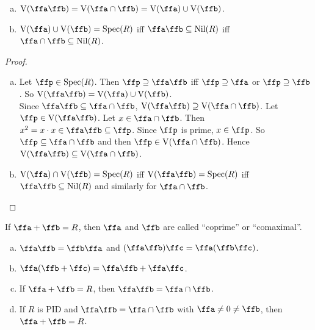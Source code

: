 \begin{proposition}
    \begin{enumerate}[(a)]
        \item 
            $\operatorname{V}(\ffa \ffb) = \operatorname{V}(\ffa \cap \ffb) = \operatorname{V}(\ffa) \cup \operatorname{V}(\ffb)$.
        \item 
            $\operatorname{V}(\ffa) \cup \operatorname{V}(\ffb) = \operatorname{Spec}(R)$ iff $\ffa \ffb \subseteq \operatorname{Nil}(R)$ iff $\ffa \cap \ffb \subseteq \operatorname{Nil}(R)$.
    \end{enumerate}
\end{proposition}

\begin{proof}
    \begin{enumerate}[(a)]
        \item Let $\ffp \in \operatorname{Spec}(R)$. Then $\ffp \supseteq \ffa \ffb$ iff $\ffp \supseteq \ffa$ or $\ffp \supseteq \ffb$. So $\operatorname{V}(\ffa \ffb) = \operatorname{V}(\ffa) \cup \operatorname{V}(\ffb)$. \\
            Since $\ffa \ffb \subseteq \ffa \cap \ffb$, $\operatorname{V}(\ffa \ffb) \supseteq \operatorname{V}(\ffa \cap \ffb)$. Let $\ffp \in \operatorname{V}(\ffa \ffb)$. Let $x \in \ffa \cap \ffb$. Then $x^2 = x \cdot x \in \ffa \ffb \subseteq \ffp$. Since $\ffp$ is prime, $x \in \ffp$. So $\ffp \subseteq \ffa \cap \ffb$ and then $\ffp \in \operatorname{V}(\ffa \cap \ffb)$. Hence $\operatorname{V}(\ffa \ffb) \subseteq \operatorname{V}(\ffa \cap \ffb)$.
        \item $\operatorname{V}(\ffa) \cap \operatorname{V}(\ffb) = \operatorname{Spec}(R)$ iff $\operatorname{V}(\ffa \ffb) = \operatorname{Spec}(R)$ iff $\ffa\ffb \subseteq \operatorname{Nil}(R)$ and similarly for $\ffa \cap \ffb$.
    \end{enumerate}
\end{proof}

\begin{definition}
    If $\ffa + \ffb = R$, then $\ffa$ and $\ffb$ are called ``coprime'' or ``comaximal''.
\end{definition}

\begin{proposition}
    \begin{enumerate}[(a)]
        \item $\ffa \ffb = \ffb \ffa$ and $(\ffa \ffb)\ffc = \ffa(\ffb\ffc)$.
        \item $\ffa(\ffb + \ffc) = \ffa \ffb + \ffa \ffc$.
        \item If $\ffa + \ffb = R$, then $\ffa \ffb = \ffa \cap \ffb$.
        \item If $R$ is PID and $\ffa \ffb = \ffa \cap \ffb$ with $\ffa \neq 0 \neq \ffb$, then $\ffa + \ffb = R$.
    \end{enumerate}
\end{proposition}

